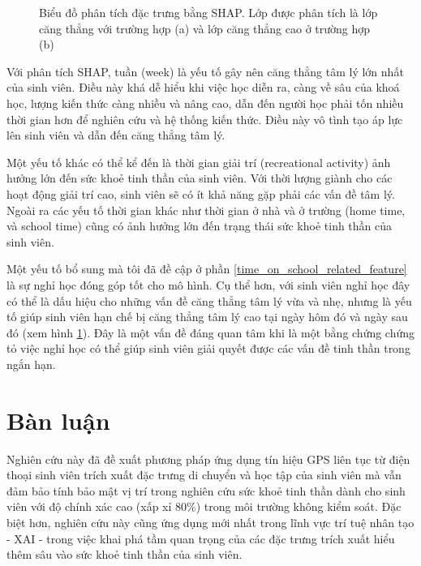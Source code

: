 \begin{figure}[!ht]
{}
\caption{Biểu đồ phân tích đặc trưng bằng SHAP. Lớp được phân tích là lớp căng thẳng với trường hợp (a) và lớp căng thẳng cao ở trường hợp (b)}
\label{feat_imp}
\end{figure}

Với phân tích SHAP, tuần (week) là yếu tố gây nên căng thẳng tâm lý lớn nhất của sinh viên. Điều này khá dễ hiểu khi việc học diễn ra, càng về sâu của khoá học, lượng kiến thức càng nhiều và nâng cao, dẫn đến người học phải tốn nhiều thời gian hơn để nghiên cứu và hệ thống kiến thức. Điều này vô tình tạo áp lực lên sinh viên và dẫn đến căng thẳng tâm lý.

Một yếu tố khác có thể kể đến là thời gian giải trí (recreational activity) ảnh hưởng lớn đến sức khoẻ tinh thần của sinh viên. Với thời lượng giành cho các hoạt động giải trí cao, sinh viên sẽ có ít khả năng gặp phải các vấn đề tâm lý. Ngoài ra các yếu tố thời gian khác như thời gian ở nhà và ở trường (home time, và school time) cũng có ảnh hưởng lớn đến trạng thái sức khoẻ tinh thần của sinh viên.

Một yếu tố bổ sung mà tôi đã đề cập ở phần \ref{time_on_school_related_feature} là sự nghỉ học đóng góp tốt cho mô hình. Cụ thể hơn, với sinh viên nghỉ học đây có thể là dấu hiệu cho những vấn đề căng thẳng tâm lý vừa và nhẹ, nhưng là yếu tố giúp sinh viên hạn chế bị căng thẳng tâm lý cao tại ngày hôm đó và ngày sau đó (xem hình \ref{feat_imp}). Đây là một vấn đề đáng quan tâm khi là một bằng chứng chứng tỏ việc nghỉ học có thể giúp sinh viên giải quyết được các vấn đề tinh thần trong ngắn hạn.


\section{Bàn luận}
Nghiên cứu này đã đề xuất phương pháp ứng dụng tín hiệu GPS liên tục từ điện thoại sinh viên trích xuất đặc trưng di chuyển và học tập của sinh viên mà vẫn đảm bảo tính bảo mật vị trí trong nghiên cứu sức khoẻ tinh thần dành cho sinh viên với độ chính xác cao (xấp xỉ 80\%) trong môi trường không kiểm soát. Đặc biệt hơn, nghiên cứu này cũng ứng dụng mới nhất trong lĩnh vực trí tuệ nhân tạo - XAI - trong việc khai phá tầm quan trọng của các đặc trưng trích xuất hiểu thêm sâu vào sức khoẻ tinh thần của sinh viên.

